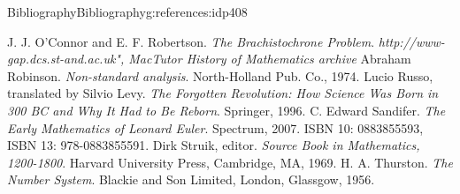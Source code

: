 \documentclass[oneside,10pt,]{book}
\newcommand{\xreffont}{\relax}
\numberwithin{equation}{section}
\begin{document}
\begin{references-chapter-numberless}{Bibliography}{}{Bibliography}{}{}{g:references:idp408}
\begin{referencelist}
\hypertarget{x:biblio:Bernoulli_bio_mactutor}{}J. J. O'Connor and E. F. Robertson. \emph{The Brachistochrone Problem}. \emph{http:\slash{}\slash{}www-gap.dcs.st-and.ac.uk", MacTutor History of Mathematics archive}
\hypertarget{x:biblio:robinson74__non_stand_analy}{}Abraham Robinson. \emph{Non-standard analysis}. North-Holland Pub. Co., 1974.
\hypertarget{x:biblio:russo96__forgot_revol}{}Lucio Russo, translated by Silvio Levy. \emph{The Forgotten Revolution: How Science Was Born in 300 BC and Why It Had to Be Reborn}. Springer, 1996.
\hypertarget{x:biblio:sandifer07__early_mathem_leonar_euler}{}C. Edward Sandifer. \emph{The Early Mathematics of Leonard Euler}. Spectrum, 2007. ISBN 10: 0883855593, ISBN 13: 978-0883855591.
\hypertarget{x:biblio:struik69__sourc_book_mathem}{}Dirk Struik, editor. \emph{Source Book in Mathematics, 1200-1800}. Harvard University Press, Cambridge, MA, 1969.
\hypertarget{x:biblio:thurston56__number_system}{}H. A. Thurston. \emph{The Number System}. Blackie and Son Limited, London, Glassgow, 1956.
\end{referencelist}
\end{references-chapter-numberless}
%
{\xreffont\printindex}
%
\end{document}
